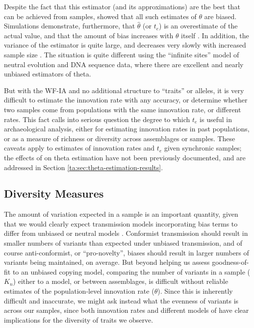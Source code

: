Despite the fact that this estimator (and its approximations) are the best that can be achieved from samples, \citet{ewens1972sampling} showed that all such estimates of $\theta$ are biased.  Simulations demonstrate, furthermore, that $\hat{\theta}$ (or $t_e$) is an overestimate of the actual value, and that the amount of bias increases with $\theta$ itself \citep{ewens1974some}.   In addition, the variance of the estimator is quite large, and decreases very slowly with increased sample size \citep{durrett2008}.  The situation is quite different using the ``infinite sites'' model of neutral evolution and DNA sequence data, where there are excellent and nearly unbiased estimators of theta.  

But with the WF-IA and no additional structure to ``traits'' or alleles, it is very difficult to estimate the innovation rate with any accuracy, or determine whether two samples come from populations with the same innovation rate, or different rates.  This fact calls into serious question the degree to which $t_e$ is useful in archaeological analysis, either for estimating innovation rates in past populations, or as a measure of richness or diversity across assemblages or samples.  These caveats apply to estimates of innovation rates and $t_e$ given synchronic samples; the effects of \timeav on theta estimation have not been previously documented, and are addressed in Section \ref{ta:sec:theta-estimation-results}.  

   
\subsection{Diversity Measures}\label{ta:sec:diversity-measures}

The amount of variation expected in a sample is an important quantity, given that we would clearly expect transmission models incorporating bias terms to differ from unbiased or neutral models \citep[e.g.][]{8977}.  Conformist transmission should result in smaller numbers of variants than expected under unbiased transmission, and of course anti-conformist, or ``pro-novelty'', biases should result in larger numbers of variants being maintained, on average.  But beyond helping us assess goodness-of-fit to an unbiased copying model, comparing the number of variants in a sample ($K_n$) either to a model, or between assemblages, is difficult without reliable estimates of the population-level innovation rate ($\theta$).  Since this is inherently difficult and inaccurate, we might ask instead what the evenness of variants is across our samples, since both innovation rates and different models of \ct have clear implications for the diversity of traits we observe.  

